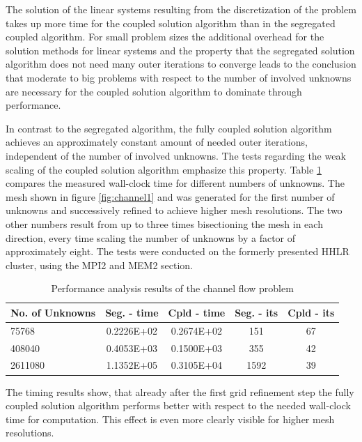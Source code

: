 The solution of the linear systems resulting from the discretization of the problem takes up more time for the coupled solution algorithm than in the segregated coupled algorithm. For small problem sizes the additional overhead for the solution methods for linear systems and the property that the segregated solution algorithm does not need many outer iterations to converge leads to the conclusion that moderate to big problems with respect to the number of involved unknowns are necessary for the coupled solution algorithm to dominate through performance. 

In contrast to the segregated algorithm, the fully coupled solution algorithm achieves an approximately constant amount of needed outer iterations, independent of the number of involved unknowns. The tests regarding the weak scaling of the coupled solution algorithm emphasize this property. Table \ref{tab:channelcompare} compares the measured wall-clock time for different numbers of unknowns. The mesh shown in figure \ref{fig:channel1} and was generated for the first number of unknowns and successively refined to achieve higher mesh resolutions. The two other numbers result from up to three times bisectioning the mesh in each direction, every time scaling the number of unknowns by a factor of approximately eight. The tests were conducted on the formerly presented HHLR cluster, using the MPI2 and MEM2 section. 

\begin{table}[h!]\centering
{}
  \begin{tabular}{lcccc}\toprule
    No. of Unknowns & Seg. - time & Cpld - time & Seg. - its & Cpld - its \\
    \midrule
    \rowcolor{black!20} 75768    & 0.2226E+02 & 0.2674E+02 & 151  & 67 \\
    \rowcolor{black!00} 408040   & 0.4053E+03 & 0.1500E+03 & 355  & 42 \\
    \rowcolor{black!20} 2611080  & 1.1352E+05 & 0.3105E+04 & 1592 & 39 \\
  \end{tabular}
  \caption{Performance analysis results of the channel flow problem}
  \label{tab:channelcompare}
\end{table}

The timing results show, that already after the first grid refinement step the fully coupled solution algorithm performs better with respect to the needed wall-clock time for computation. This effect is even more clearly visible for higher mesh resolutions.

